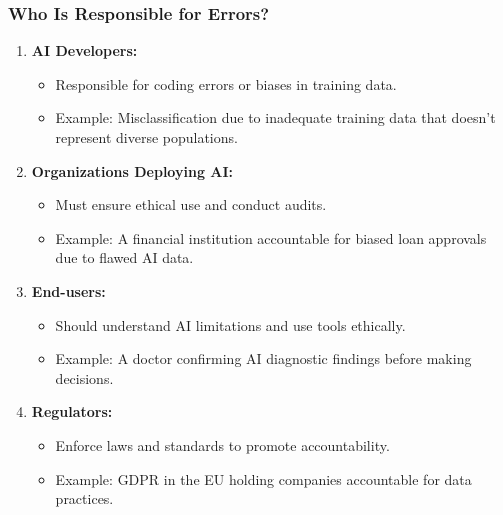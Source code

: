 \documentclass[aspectratio=169]{beamer}
\begin{document}
\begin{frame}[fragile]
    \frametitle{Who Is Responsible for Errors?}
    \begin{enumerate}
        \item \textbf{AI Developers:}
        \begin{itemize}
            \item Responsible for coding errors or biases in training data.
            \item Example: Misclassification due to inadequate training data that doesn't represent diverse populations.
        \end{itemize}

        \item \textbf{Organizations Deploying AI:}
        \begin{itemize}
            \item Must ensure ethical use and conduct audits.
            \item Example: A financial institution accountable for biased loan approvals due to flawed AI data.
        \end{itemize}
        
        \item \textbf{End-users:}
        \begin{itemize}
            \item Should understand AI limitations and use tools ethically.
            \item Example: A doctor confirming AI diagnostic findings before making decisions.
        \end{itemize}
        
        \item \textbf{Regulators:}
        \begin{itemize}
            \item Enforce laws and standards to promote accountability.
            \item Example: GDPR in the EU holding companies accountable for data practices.
        \end{itemize}
    \end{enumerate}
\end{frame}
\end{document}
